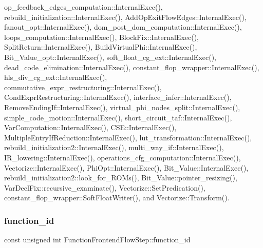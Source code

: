op\+\_\+feedback\+\_\+edges\+\_\+computation\+::\+Internal\+Exec(), rebuild\+\_\+initialization\+::\+Internal\+Exec(), Add\+Op\+Exit\+Flow\+Edges\+::\+Internal\+Exec(), fanout\+\_\+opt\+::\+Internal\+Exec(), dom\+\_\+post\+\_\+dom\+\_\+computation\+::\+Internal\+Exec(), loops\+\_\+computation\+::\+Internal\+Exec(), Block\+Fix\+::\+Internal\+Exec(), Split\+Return\+::\+Internal\+Exec(), Build\+Virtual\+Phi\+::\+Internal\+Exec(), Bit\+\_\+\+Value\+\_\+opt\+::\+Internal\+Exec(), soft\+\_\+float\+\_\+cg\+\_\+ext\+::\+Internal\+Exec(), dead\+\_\+code\+\_\+elimination\+::\+Internal\+Exec(), constant\+\_\+flop\+\_\+wrapper\+::\+Internal\+Exec(), hls\+\_\+div\+\_\+cg\+\_\+ext\+::\+Internal\+Exec(), commutative\+\_\+expr\+\_\+restructuring\+::\+Internal\+Exec(), Cond\+Expr\+Restructuring\+::\+Internal\+Exec(), interface\+\_\+infer\+::\+Internal\+Exec(), Remove\+Ending\+If\+::\+Internal\+Exec(), virtual\+\_\+phi\+\_\+nodes\+\_\+split\+::\+Internal\+Exec(), simple\+\_\+code\+\_\+motion\+::\+Internal\+Exec(), short\+\_\+circuit\+\_\+taf\+::\+Internal\+Exec(), Var\+Computation\+::\+Internal\+Exec(), C\+S\+E\+::\+Internal\+Exec(), Multiple\+Entry\+If\+Reduction\+::\+Internal\+Exec(), lut\+\_\+transformation\+::\+Internal\+Exec(), rebuild\+\_\+initialization2\+::\+Internal\+Exec(), multi\+\_\+way\+\_\+if\+::\+Internal\+Exec(), I\+R\+\_\+lowering\+::\+Internal\+Exec(), operations\+\_\+cfg\+\_\+computation\+::\+Internal\+Exec(), Vectorize\+::\+Internal\+Exec(), Phi\+Opt\+::\+Internal\+Exec(), Bit\+\_\+\+Value\+::\+Internal\+Exec(), rebuild\+\_\+initialization2\+::look\+\_\+for\+\_\+\+R\+O\+Ms(), Bit\+\_\+\+Value\+::pointer\+\_\+resizing(), Var\+Decl\+Fix\+::recursive\+\_\+examinate(), Vectorize\+::\+Set\+Predication(), constant\+\_\+flop\+\_\+wrapper\+::\+Soft\+Float\+Writer(), and Vectorize\+::\+Transform().

\mbox{\label{classFunctionFrontendFlowStep_a58ef2383ad1a212a8d3f396625a4b616}} 
\subsubsection{\texorpdfstring{function\+\_\+id}{function\_id}}
{\footnotesize\ttfamily const unsigned int Function\+Frontend\+Flow\+Step\+::function\+\_\+id\hspace{0.3cm}{\ttfamily [protected]}}



